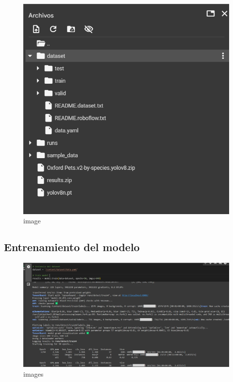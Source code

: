 \documentclass[11pt]{article}
\begin{document}
    \begin{figure}
\centering
\includegraphics{imgs/Comprobamos que se descomprimio bien.png}
\caption{image}
\end{figure}

    \subsection{Entrenamiento del
modelo}\label{entrenamiento-del-modelo}

    \begin{figure}
\centering
\includegraphics{imgs/Entrenamos el modelo.png}
\caption{images}
\end{figure}
\end{document}
